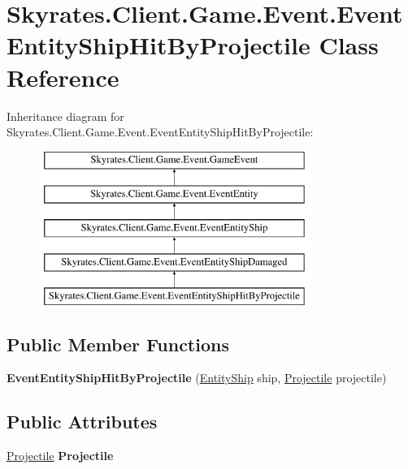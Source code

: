 \hypertarget{class_skyrates_1_1_client_1_1_game_1_1_event_1_1_event_entity_ship_hit_by_projectile}{\section{Skyrates.\-Client.\-Game.\-Event.\-Event\-Entity\-Ship\-Hit\-By\-Projectile Class Reference}
\label{class_skyrates_1_1_client_1_1_game_1_1_event_1_1_event_entity_ship_hit_by_projectile}
}
Inheritance diagram for Skyrates.\-Client.\-Game.\-Event.\-Event\-Entity\-Ship\-Hit\-By\-Projectile\-:\begin{figure}[H]
\begin{center}
\leavevmode
\includegraphics[height=5.000000cm]{class_skyrates_1_1_client_1_1_game_1_1_event_1_1_event_entity_ship_hit_by_projectile}
\end{center}
\end{figure}
\subsection*{Public Member Functions}
\begin{DoxyCompactItemize}
\item 
\hypertarget{class_skyrates_1_1_client_1_1_game_1_1_event_1_1_event_entity_ship_hit_by_projectile_a493b6dc899b8c8e0f149d72f29765394}{{\bfseries Event\-Entity\-Ship\-Hit\-By\-Projectile} (\hyperlink{class_skyrates_1_1_common_1_1_entity_1_1_entity_ship}{Entity\-Ship} ship, \hyperlink{class_projectile}{Projectile} projectile)}\label{class_skyrates_1_1_client_1_1_game_1_1_event_1_1_event_entity_ship_hit_by_projectile_a493b6dc899b8c8e0f149d72f29765394}

\end{DoxyCompactItemize}
\subsection*{Public Attributes}
\begin{DoxyCompactItemize}
\item 
\hypertarget{class_skyrates_1_1_client_1_1_game_1_1_event_1_1_event_entity_ship_hit_by_projectile_a2dbbb03868855c43c4f1885835219082}{\hyperlink{class_projectile}{Projectile} {\bfseries Projectile}}\label{class_skyrates_1_1_client_1_1_game_1_1_event_1_1_event_entity_ship_hit_by_projectile_a2dbbb03868855c43c4f1885835219082}

\end{DoxyCompactItemize}
